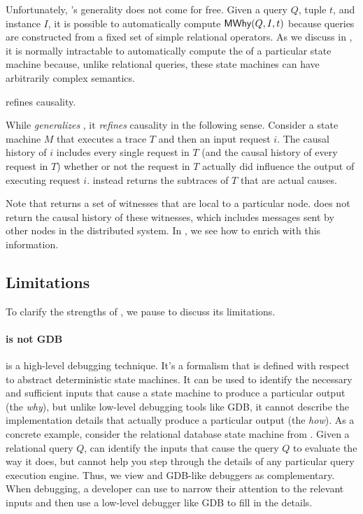Unfortunately, \watprovenance{}'s generality does not come for free. Given a
query $Q$, tuple $t$, and instance $I$, it is possible to automatically compute
$\textsf{MWhy}(Q, I, t)$ because queries are constructed from a fixed set of simple
relational operators. As we discuss in , it is normally
intractable to automatically compute the \watprovenance{} of a particular state
machine because, unlike relational queries, these state machines can have
arbitrarily complex semantics.

\begin{claim}
  \Watprovenance{} refines causality.
\end{claim}

While \watprovenance{} \emph{generalizes} \whyprovenance{}, it \emph{refines}
causality in the following sense. Consider a state machine $M$ that executes a
trace $T$ and then an input request $i$. The causal history of $i$ includes
every single request in $T$ (and the causal history of every request in $T$)
whether or not the request in $T$ actually did influence the output of
executing request $i$. \Watprovenance{} instead returns the subtraces of $T$
that are actual causes.

Note that \watprovenance{} returns a set of witnesses that are local to a
particular node. \Watprovenance{} does not return the causal history of these
witnesses, which includes messages sent by other nodes in the distributed
system. In , we see how to enrich \watprovenance{} with this
information.

\subsection{Limitations}
To clarify the strengths of \watprovenance{}, we pause to discuss its
limitations.

\paragraph{\Watprovenance{} is not GDB}
\Watprovenance{} is a high-level debugging technique. It's a formalism that is
defined with respect to abstract deterministic state machines. It can be used
to identify the necessary and sufficient inputs that cause a state machine to
produce a particular output (the \emph{why}), but unlike low-level debugging
tools like GDB, it cannot describe the implementation details that actually
produce a particular output (the \emph{how}).  As a concrete example, consider
the relational database state machine from .
Given a relational query $Q$, \watprovenance{} can identify the inputs that
cause the query $Q$ to evaluate the way it does, but \watprovenance{} cannot
help you step through the details of any particular query execution engine.
Thus, we view \watprovenance{} and GDB-like debuggers as complementary. When
debugging, a developer can use \watprovenance{} to narrow their attention to
the relevant inputs and then use a low-level debugger like GDB to fill in the
details.

